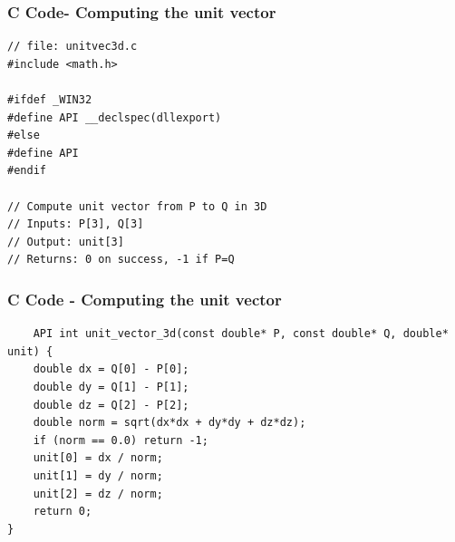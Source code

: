\documentclass{beamer}
\begin{document}
	\begin{frame}[fragile]
	\frametitle{C Code- Computing the unit vector}
	
	\begin{lstlisting}
// file: unitvec3d.c
#include <math.h>

#ifdef _WIN32
#define API __declspec(dllexport)
#else
#define API
#endif

// Compute unit vector from P to Q in 3D
// Inputs: P[3], Q[3]
// Output: unit[3]
// Returns: 0 on success, -1 if P=Q

	\end{lstlisting}
\end{frame}
\begin{frame}[fragile]
\frametitle{C Code - Computing the unit vector}
\begin{lstlisting}
    API int unit_vector_3d(const double* P, const double* Q, double* unit) {
    double dx = Q[0] - P[0];
    double dy = Q[1] - P[1];
    double dz = Q[2] - P[2];
    double norm = sqrt(dx*dx + dy*dy + dz*dz);
    if (norm == 0.0) return -1;
    unit[0] = dx / norm;
    unit[1] = dy / norm;
    unit[2] = dz / norm;
    return 0;
}
\end{lstlisting}
\end{frame}
\end{document}
